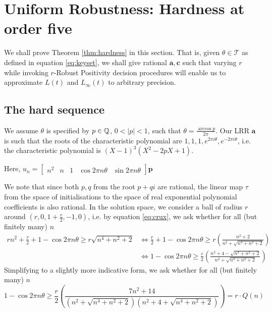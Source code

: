 \section{Uniform Robustness: Hardness at order five}
\label{section:hardness}
We shall prove Theorem \ref{thm:hardness} in this section. That is, given $\theta \in \mathcal{T}$ as defined in equation \ref{eq:keyset}, we shall give rational $\mathbf{a}, \mathbf{c}$ such that varying $r$ while invoking $r$-Robust Positivity decision procedures will enable us to approximate $L(t)$ and $L_\infty(t)$ to arbitrary precision.

\subsection{The hard sequence}
We assume $\theta$ is specified by $p \in \mathbb{Q}$, $0 < |p| < 1$, such that $\theta = \frac{\arccos p}{2\pi}$. Our LRR $\mathbf{a}$ is such that the roots of the characteristic polynomial are $1, 1, 1, e^{2\pi i\theta}, e^{-2\pi i \theta}$, i.e. the characteristic polynomial is 
$
(X- 1)^3(X^2 - 2pX + 1)
$.

Here, 
$
u_n = \begin{bmatrix}
n^2 & n & 1 & \cos 2\pi n\theta & \sin 2\pi n\theta
\end{bmatrix}
\mathbf{p}
$

We note that since both $p, q$ from the root $p + qi$ are rational, the linear map $\tau$ from the space of initialisations to the space of real exponential polynomial coefficients is also rational. In the solution space, we consider a ball of radius $r$ around $(r, 0, 1+\frac{r}{2}, -1, 0)$, i.e. by equation \ref{eq:crux}, we ask whether for all (but finitely many) $n$
\begin{align*}
rn^2 + \frac{r}{2} + 1 - \cos 2\pi n\theta \ge r\sqrt{n^4 + n^2 + 2} 
&\Leftrightarrow \frac{r}{2} + 1 - \cos 2\pi n\theta \ge r\left(\frac{n^2 + 2}{n^2 + \sqrt{n^4 + n^2 + 2}}\right) \\
&\Leftrightarrow 1 - \cos 2\pi n\theta \ge \frac{r}{2}\left(\frac{n^2 + 4 - \sqrt{n^4 + n^2 + 2}}{n^2 + \sqrt{n^4 + n^2 + 2}}\right)
\end{align*}
Simplifying to a slightly more indicative form, we ask whether for all (but finitely many) $n$
\begin{equation}
\label{eq:pivotal}
1 - \cos 2\pi n\theta \ge \frac{r}{2}\left(\frac{7n^2 + 14}{(n^2 + \sqrt{n^4 + n^2 + 2})(n^2 +4+  \sqrt{n^4 + n^2 + 2})}\right) = r\cdot Q(n)
\end{equation}

